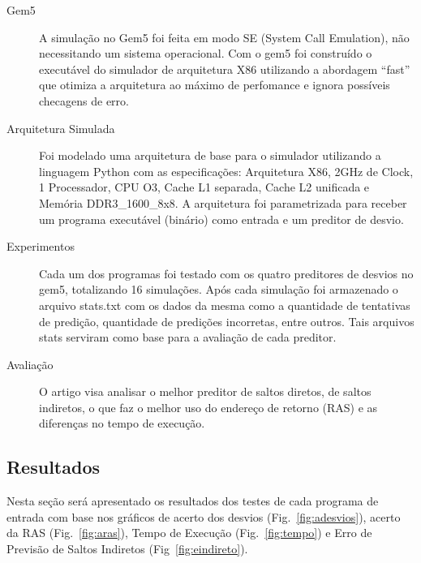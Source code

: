 \documentclass[12pt]{article}
\begin{document}
\begin{description}
\item[Gem5]

A simulação no Gem5 foi feita em modo SE (System Call Emulation), não necessitando um sistema operacional. Com o gem5 foi construído o executável do simulador de arquitetura X86 utilizando a abordagem ``fast'' que otimiza a arquitetura ao máximo de perfomance e ignora possíveis checagens de erro.

\item[Arquitetura Simulada]

Foi modelado uma arquitetura de base para o simulador utilizando a linguagem Python com as especificações: Arquitetura X86, 2GHz de Clock, 1 Processador, CPU O3, Cache L1 separada, Cache L2 unificada e Memória DDR3\_1600\_8x8. A arquitetura foi parametrizada para receber um programa executável (binário) como entrada e um preditor de desvio.

\item[Experimentos]  

Cada um dos programas foi testado com os quatro preditores de desvios no gem5, totalizando 16 simulações. Após cada simulação foi armazenado o arquivo stats.txt com os dados da mesma como a quantidade de tentativas de predição, quantidade de predições incorretas, entre outros. Tais arquivos stats serviram como base para a avaliação de cada preditor.

\item[Avaliação]

O artigo visa analisar o melhor preditor de saltos diretos, de saltos indiretos, o que faz o melhor uso do endereço de retorno (RAS) e as diferenças no tempo de execução.

\end{description}

\subsection{Resultados}

Nesta seção será apresentado os resultados dos testes de cada programa de entrada com base nos gráficos de acerto dos desvios (Fig.~\ref{fig:adesvios}), acerto da RAS (Fig.~\ref{fig:aras}), Tempo de Execução (Fig.~\ref{fig:tempo}) e Erro de Previsão de Saltos Indiretos (Fig~\ref{fig:eindireto}). 
\end{document}
